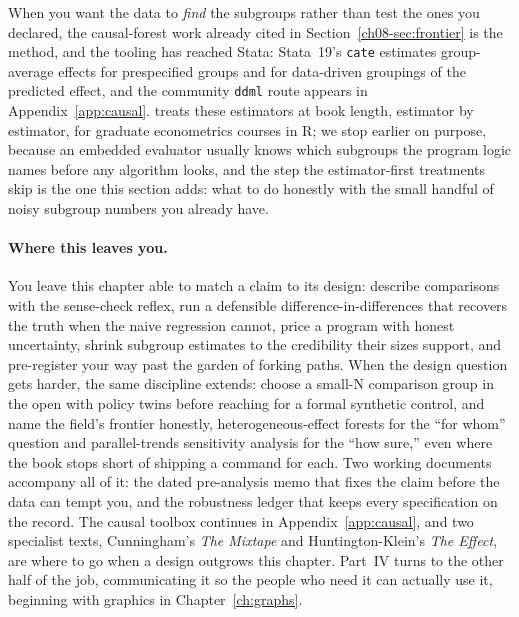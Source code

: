When you want the data to \emph{find} the subgroups rather than test the ones you declared, the causal-forest work already cited in Section~\ref{ch08-sec:frontier} is the method, and the tooling has reached Stata: Stata~19's \texttt{cate} estimates group-average effects for prespecified groups and for data-driven groupings of the predicted effect, and the community \texttt{ddml} route appears in Appendix~\ref{app:causal}. \textcite{huber2023causal} treats these estimators at book length, estimator by estimator, for graduate econometrics courses in R; we stop earlier on purpose, because an embedded evaluator usually knows which subgroups the program logic names before any algorithm looks, and the step the estimator-first treatments skip is the one this section adds: what to do honestly with the small handful of noisy subgroup numbers you already have.

\paragraph{Where this leaves you.} You leave this chapter able to match a claim to its design: describe comparisons with the sense-check reflex, run a defensible difference-in-differences that recovers the truth when the naive regression cannot, price a program with honest uncertainty, shrink subgroup estimates to the credibility their sizes support, and pre-register your way past the garden of forking paths. When the design question gets harder, the same discipline extends: choose a small-N comparison group in the open with policy twins before reaching for a formal synthetic control, and name the field's frontier honestly, heterogeneous-effect forests for the \enquote{for whom} question and parallel-trends sensitivity analysis for the \enquote{how sure,} even where the book stops short of shipping a command for each. Two working documents accompany all of it: the dated pre-analysis memo that fixes the claim before the data can tempt you, and the robustness ledger that keeps every specification on the record. The causal toolbox continues in Appendix~\ref{app:causal}, and two specialist texts, Cunningham's \emph{The Mixtape} and Huntington-Klein's \emph{The Effect}, are where to go when a design outgrows this chapter. Part~IV turns to the other half of the job, communicating it so the people who need it can actually use it, beginning with graphics in Chapter~\ref{ch:graphs}.

